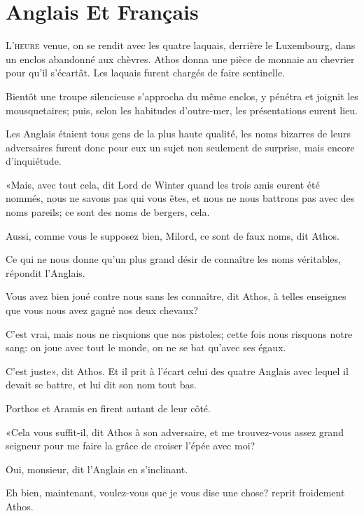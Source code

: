
\chapter{Anglais Et Français} 

\lettrine{L}{'heure} venue, on se rendit avec les quatre laquais, derrière le Luxembourg, dans un enclos abandonné aux chèvres. Athos donna une pièce de monnaie au chevrier pour qu'il s'écartât. Les laquais furent chargés de faire sentinelle. 

Bientôt une troupe silencieuse s'approcha du même enclos, y pénétra et joignit les mousquetaires; puis, selon les habitudes d'outre-mer, les présentations eurent lieu. 

Les Anglais étaient tous gens de la plus haute qualité, les noms bizarres de leurs adversaires furent donc pour eux un sujet non seulement de surprise, mais encore d'inquiétude. 

«Mais, avec tout cela, dit Lord de Winter quand les trois amis eurent été nommés, nous ne savons pas qui vous êtes, et nous ne nous battrons pas avec des noms pareils; ce sont des noms de bergers, cela. 

\speak  Aussi, comme vous le supposez bien, Milord, ce sont de faux noms, dit Athos. 

\speak  Ce qui ne nous donne qu'un plus grand désir de connaître les noms véritables, répondit l'Anglais. 

\speak  Vous avez bien joué contre nous sans les connaître, dit Athos, à telles enseignes que vous nous avez gagné nos deux chevaux? 

\speak  C'est vrai, mais nous ne risquions que nos pistoles; cette fois nous risquons notre sang: on joue avec tout le monde, on ne se bat qu'avec ses égaux. 

\speak  C'est juste», dit Athos. Et il prit à l'écart celui des quatre Anglais avec lequel il devait se battre, et lui dit son nom tout bas. 

Porthos et Aramis en firent autant de leur côté. 

«Cela vous suffit-il, dit Athos à son adversaire, et me trouvez-vous assez grand seigneur pour me faire la grâce de croiser l'épée avec moi? 

\speak  Oui, monsieur, dit l'Anglais en s'inclinant. 

\speak  Eh bien, maintenant, voulez-vous que je vous dise une chose? reprit froidement Athos. 

